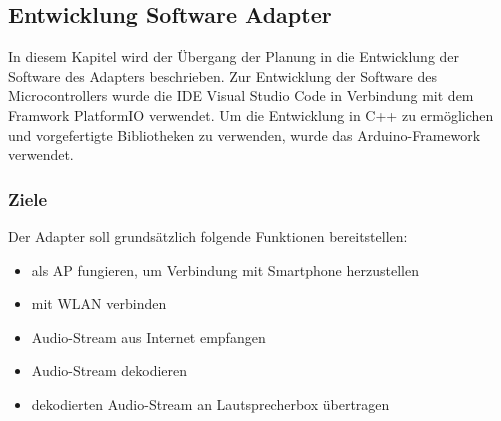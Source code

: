 \documentclass[]{article}
\begin{document}
\subsection{Entwicklung Software Adapter}
In diesem Kapitel wird der Übergang der Planung in die Entwicklung der Software des Adapters beschrieben. 
Zur Entwicklung der Software des Microcontrollers wurde die IDE Visual Studio Code in Verbindung mit dem Framwork PlatformIO verwendet. Um die Entwicklung in C++ zu ermöglichen und vorgefertigte Bibliotheken zu verwenden, wurde das Arduino-Framework verwendet.

\subsubsection{Ziele}
Der Adapter soll grundsätzlich folgende Funktionen bereitstellen:
\begin{itemize}
\item als AP fungieren, um Verbindung mit Smartphone herzustellen
\item mit WLAN verbinden
\item Audio-Stream aus Internet empfangen
\item Audio-Stream dekodieren
\item dekodierten Audio-Stream an Lautsprecherbox übertragen
\end{itemize}
\end{document}
